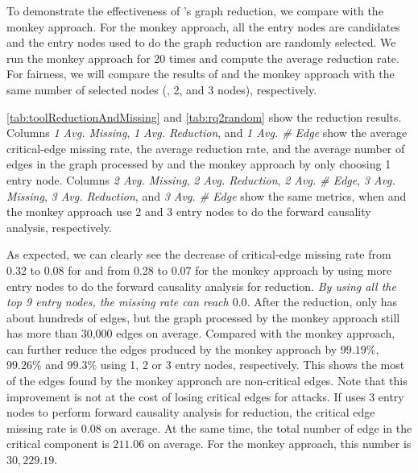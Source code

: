 To demonstrate the effectiveness of \tool's graph reduction, we compare \tool with the monkey  approach. 
For the monkey  approach, all the entry nodes are candidates and the entry nodes used to do the graph reduction are randomly selected. 
We run the monkey approach for 20 times and compute the average reduction rate.
For fairness, we will compare the results of \tool and the monkey approach with the same number of selected nodes (, 2, and 3 nodes), respectively.



\cref{tab:toolReductionAndMissing} and \cref{tab:rq2random} show the reduction results.
Columns \emph{1 Avg. Missing}, \emph{1 Avg. Reduction}, and \emph{1 Avg. \# Edge} show the average critical-edge missing rate, the average reduction rate, and the average number of edges in the graph processed by \tool and the monkey approach by only choosing 1 entry node.
Columns \emph{2 Avg. Missing}, \emph{2 Avg. Reduction}, \emph{2 Avg. \# Edge}, \emph{3 Avg. Missing}, \emph{3 Avg. Reduction}, and \emph{3 Avg. \# Edge} show the same metrics, when \tool and the monkey approach use 2 and 3 entry nodes to do the forward causality analysis, respectively. 

As expected, we can clearly see the decrease of critical-edge missing rate from 0.32 to 0.08 for \tool and from 0.28 to 0.07 for the monkey approach by using more entry nodes to do the forward causality analysis for reduction. 
\emph{By using all the top 9 entry nodes, the missing rate can reach $0.0$}.
After the reduction, \tool only has about hundreds of edges, but the graph processed by the monkey approach still has more than 30,000 edges on average. 
Compared with the monkey approach, \tool can further reduce the edges produced by the monkey approach by $99.19\%$, $99.26\%$ and $99.3\%$ using 1, 2 or 3 entry nodes, respectively.
This shows the most of the edges found by the monkey approach are non-critical edges.
Note that this improvement is not at the cost of losing critical edges for attacks. 
If \tool uses 3 entry nodes to perform forward causality analysis for reduction, the critical edge missing rate is 0.08 on average. 
At the same time, the total number of edge in the critical component is $211.06$ on average. 
For the monkey approach, this number is $30,229.19$.


